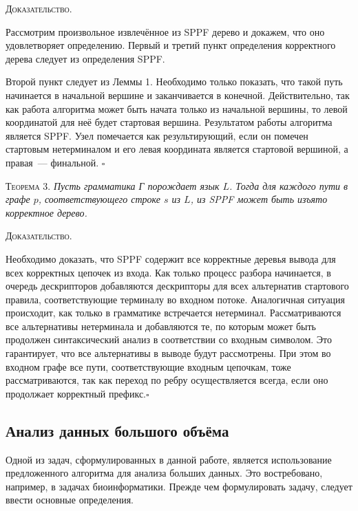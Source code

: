 \textsc{Доказательство.}

Рассмотрим произвольное извлечённое из SPPF дерево и докажем, что оно удовлетворяет определению. Первый и третий пункт определения корректного дерева следует из определения SPPF. 

Второй пункт следует из Леммы 1. Необходимо только показать, что такой путь начинается в начальной вершине и заканчивается в конечной. Действительно, так как работа алгоритма может быть начата только из начальной вершины, то левой координатой для неё будет стартовая вершина. Результатом работы алгоритма является SPPF. Узел помечается как результирующий, если он помечен стартовым нетерминалом и его левая координата является стартовой вершиной, а правая~--- финальной. $\square$

\textsc{Теорема 3.} 
\textit{Пусть грамматика Г порождает язык $L$. Тогда для каждого пути в графе $p$, соответствующего строке $s$ из $L$, из SPPF может быть изъято корректное дерево.}

\textsc{Доказательство.}

Необходимо доказать, что SPPF содержит все корректные деревья вывода для всех корректных цепочек из входа. Как только процесс разбора начинается, в очередь дескрипторов добавляются дескрипторы для всех альтернатив стартового правила, соответствующие терминалу во входном потоке. Аналогичная ситуация происходит, как только в грамматике встречается нетерминал. Рассматриваются все альтернативы нетерминала и добавляются те, по которым может быть продолжен синтаксический анализ в соответствии со входным символом. Это гарантирует, что все альтернативы в выводе будут рассмотрены. При этом во входном графе все пути, соответствующие входным цепочкам, тоже рассматриваются, так как переход по ребру осуществляется всегда, если оно продолжает корректный префикс.$\square$

\subsection{Анализ данных большого объёма}
Одной из задач, сформулированных в данной работе, является использование предложенного алгоритма для анализа больших данных. Это востребовано, например, в задачах биоинформатики. Прежде чем формулировать задачу, следует ввести основные определения.

